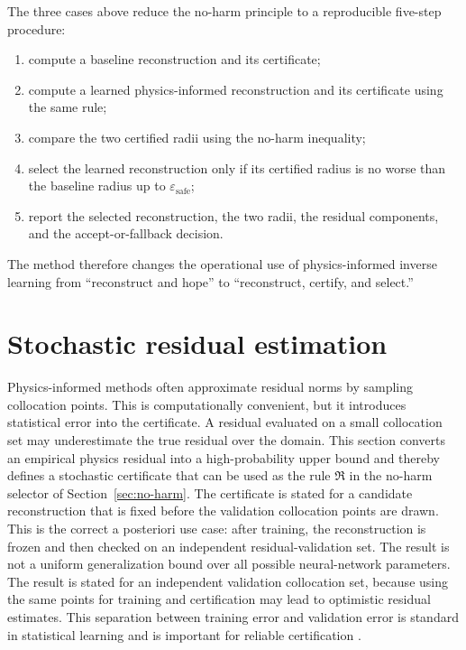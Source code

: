 \documentclass{article}
\numberwithin{equation}{section}
\theoremstyle{definition}
\begin{document}
The three cases above reduce the no-harm principle to a reproducible five-step procedure:
\begin{enumerate}[label=(\roman*)]
\item compute a baseline reconstruction and its certificate;
\item compute a learned physics-informed reconstruction and its certificate using the same rule;
\item compare the two certified radii using the no-harm inequality;
\item select the learned reconstruction only if its certified radius is no worse than the baseline radius up to \(\varepsilon_{\mathrm{safe}}\);
\item report the selected reconstruction, the two radii, the residual components, and the accept-or-fallback decision.
\end{enumerate}
The method therefore changes the operational use of physics-informed inverse learning from ``reconstruct and hope'' to ``reconstruct, certify, and select.'' 


\section{Stochastic residual estimation}
\label{sec:stochastic-residuals}

Physics-informed methods often approximate residual norms by sampling collocation points. This is computationally convenient, but it introduces statistical error into the certificate. A residual evaluated on a small collocation set may underestimate the true residual over the domain. This section converts an empirical physics residual into a high-probability upper bound and thereby defines a stochastic certificate that can be used as the rule \(\mathfrak R\) in the no-harm selector of Section~\ref{sec:no-harm}. The certificate is stated for a candidate reconstruction that is fixed before the validation collocation points are drawn. This is the correct a posteriori use case: after training, the reconstruction is frozen and then checked on an independent residual-validation set. The result is not a uniform generalization bound over all possible neural-network parameters. The result is stated for an independent validation collocation set, because using the same points for training and certification may lead to optimistic residual estimates. This separation between training error and validation error is standard in statistical learning and is important for reliable certification \cite{Vapnik1998,ShalevShwartzBenDavid2014}.
\end{document}
